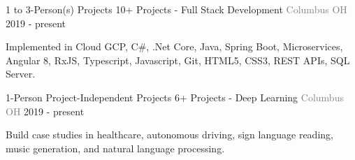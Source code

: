 \begin{cventries}
    \vspace{-2mm}   \cventry
    {1 to 3-Person(s) Projects}
    {\hspace*{0.5mm}\bullet \hspace*{0.5mm} 10+ Projects - Full Stack Development}
    {\textcolor{graytext}{Columbus OH}}
    {2019 - present}
    {
      \begin{cvitems}
        \item {Implemented in Cloud GCP, C\#, .Net Core, Java, Spring Boot, Microservices, Angular 8, RxJS, Typescript, Javascript, Git, HTML5, CSS3, REST APIs, SQL Server.}    
      \end{cvitems}   \vspace{-2mm} 
    }
  \cventry
    {1-Person Project-Independent Projects}
    {\hspace*{0.5mm}\bullet \hspace*{0.5mm} 6+ Projects - Deep Learning}
    {\textcolor{graytext}{Columbus OH}}
    {2019 - present}
    {
      \begin{cvitems}
        \item {Build case studies in healthcare, autonomous driving, sign language reading, music generation, and natural language processing.}      
      \end{cvitems}   \vspace{-2mm} 
    } 
\end{cventries}
